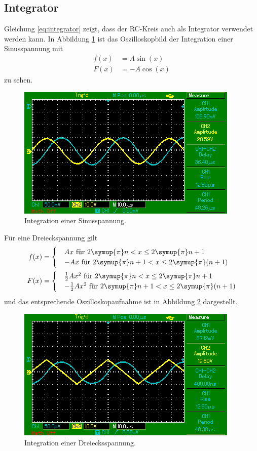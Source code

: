 \subsection{Integrator}
Gleichung \eqref{eq:integrator} zeigt, dass der RC-Kreis auch als Integrator verwendet werden kann.
In Abbildung \ref{fig:oszi2} ist das Oszilloskopbild der Integration einer Sinusspannung mit
\begin{align*}
  f(x) &= A\sin(x) \\
  F(x) &= -A\cos(x)
\end{align*}
zu sehen.
\begin{figure}[H]
  \centering
  \includegraphics{bilder/MAP003.png}
  \caption{Integration einer Sinusspannung.}
  \label{fig:oszi2}
\end{figure}

Für eine Dreieckspannung gilt
\begin{align*}
  f(x) &= \begin{cases} &Ax \text{  für } 2\symup{\pi} n < x \leq 2\symup{\pi} n + 1 \\
                        &-Ax \text{  für } 2\symup{\pi} n + 1 < x \leq 2\symup{\pi} (n+1) \end{cases} \\
  F(x) &= \begin{cases} &\frac{1}{2} Ax^2 \text{  für } 2\symup{\pi} n < x \leq 2\symup{\pi} n + 1 \\
                        &-\frac{1}{2} Ax^2 \text{  für } 2\symup{\pi} n + 1 < x \leq 2\symup{\pi} (n+1) \end{cases}
\end{align*}
und das entsprechende Oszilloskopaufnahme ist in Abbildung \ref{fig:oszi3} dargestellt.
\begin{figure}[H]
  \centering
  \includegraphics{bilder/MAP005.png}
  \caption{Integration einer Dreiecksspannung.}
  \label{fig:oszi3}
\end{figure}


